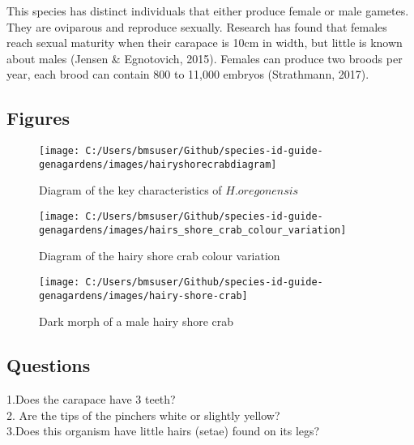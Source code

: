 \documentclass[
]{article}
\begin{document}
This species has distinct individuals that either produce female or male
gametes. They are oviparous and reproduce sexually. Research has found
that females reach sexual maturity when their carapace is 10cm in width,
but little is known about males (Jensen \& Egnotovich, 2015). Females
can produce two broods per year, each brood can contain 800 to 11,000
embryos (Strathmann, 2017).

\newpage

\hypertarget{figures-2}{%
\subsection{Figures}\label{figures-2}}

\begin{figure}

\texttt{[image: C:/Users/bmsuser/Github/species-id-guide-genagardens/images/hairyshorecrabdiagram]} \hfill{}

\caption{ Diagram of the key characteristics of $\textit{H.oregonensis}$}\label{fig:crab-water-colour}
\end{figure}

\begin{figure}

\texttt{[image: C:/Users/bmsuser/Github/species-id-guide-genagardens/images/hairs\_shore\_crab\_colour\_variation]} \hfill{}

\caption{Diagram of the hairy shore crab colour variation}\label{fig:crab-diversity}
\end{figure}

\begin{figure}

\texttt{[image: C:/Users/bmsuser/Github/species-id-guide-genagardens/images/hairy-shore-crab]} \hfill{}

\caption{Dark morph of a male hairy shore crab}\label{fig:crab-in-hand}
\end{figure}

\newpage

\hypertarget{questions-3}{%
\subsection{Questions}\label{questions-3}}

1.Does the carapace have 3 teeth?\\
2. Are the tips of the pinchers white or slightly yellow?\\
3.Does this organism have little hairs (setae) found on its legs?
\end{document}
